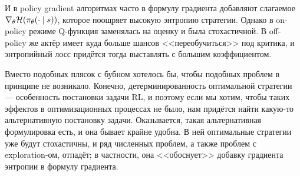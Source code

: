 И в policy gradient алгоритмах часто в формулу градиента добавляют слагаемое $\nabla_{\theta} \mathcal{H}(\pi_\theta(\cdot \mid s))$, которое поощряет высокую энтропию стратегии. Однако в on-policy режиме Q-функция заменялась на оценку и была стохастичной. В off-policy же актёр имеет куда больше шансов <<переобучиться>> под критика, и энтропийный лосс придётся тогда выставлять с большим коэффициентом.

Вместо подобных плясок с бубном хотелось бы, чтобы подобных проблем в принципе не возникало. Конечно, детерминированность оптимальной стратегии --- особенность постановки задачи RL, и поэтому если мы хотим, чтобы таких эффектов в оптимизационных процессах не было, нам придётся найти какую-то альтернативную постановку задачи. Оказывается, такая альтернативная формулировка есть, и она бывает крайне удобна. В ней оптимальные стратегии уже будут стохастичны, и ряд численных проблем, а также проблем с exploration-ом, отпадёт; в частности, она <<обоснует>> добавку градиента энтропии в формулу градиента.